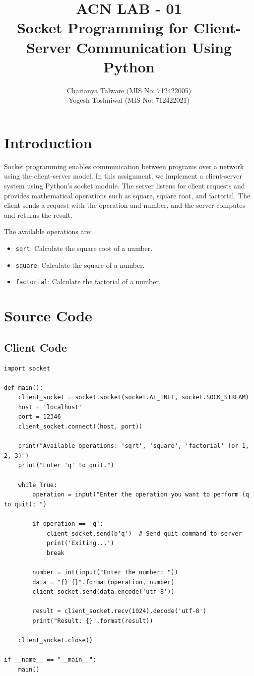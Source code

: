 \documentclass{article}
\title{ACN LAB - 01 \\Socket Programming for Client-Server Communication Using Python}
\author{Chaitanya Talware (MIS No: 712422005) \\ Yogesh Toshniwal (MIS No: 712422021)}
\date{}
\begin{document}
\maketitle
\section{Introduction}
Socket programming enables communication between programs over a network using the client-server model. In this assignment, we implement a client-server system using Python's socket module. The server listens for client requests and provides mathematical operations such as square, square root, and factorial. The client sends a request with the operation and number, and the server computes and returns the result.

The available operations are:
\begin{itemize}
    \item \texttt{sqrt}: Calculate the square root of a number.
    \item \texttt{square}: Calculate the square of a number.
    \item \texttt{factorial}: Calculate the factorial of a number.
\end{itemize}

\section{Source Code }
\subsection{Client Code}
\begin{lstlisting}[style=python]
import socket

def main():
    client_socket = socket.socket(socket.AF_INET, socket.SOCK_STREAM)
    host = 'localhost'
    port = 12346
    client_socket.connect((host, port))

    print("Available operations: 'sqrt', 'square', 'factorial' (or 1, 2, 3)")
    print("Enter 'q' to quit.")

    while True:
        operation = input("Enter the operation you want to perform (q to quit): ")
        
        if operation == 'q':
            client_socket.send(b'q')  # Send quit command to server
            print('Exiting...')
            break

        number = int(input("Enter the number: "))
        data = "{} {}".format(operation, number)
        client_socket.send(data.encode('utf-8'))

        result = client_socket.recv(1024).decode('utf-8')
        print("Result: {}".format(result))

    client_socket.close()

if __name__ == "__main__":
    main()
\end{lstlisting}
\end{document}

